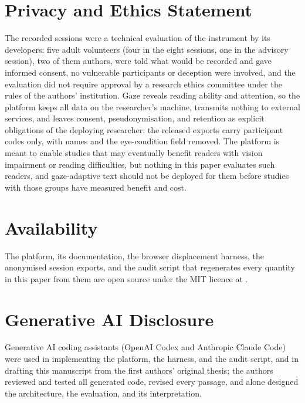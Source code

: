 \documentclass[sigconf,screen]{acmart}
\begin{document}
\section*{Privacy and Ethics Statement}
The recorded sessions were a technical evaluation of the instrument by its developers: five adult volunteers (four in the eight sessions, one in the advisory session), two of them authors, were told what would be recorded and gave informed consent, no vulnerable participants or deception were involved, and the evaluation did not require approval by a research ethics committee under the rules of the authors' institution.
Gaze reveals reading ability and attention, so the platform keeps all data on the researcher's machine, transmits nothing to external services, and leaves consent, pseudonymisation, and retention as explicit obligations of the deploying researcher; the released exports carry participant codes only, with names and the eye-condition field removed.
The platform is meant to enable studies that may eventually benefit readers with vision impairment or reading difficulties, but nothing in this paper evaluates such readers, and gaze-adaptive text should not be deployed for them before studies with those groups have measured benefit and cost.

\section*{Availability}
The platform, its documentation, the browser displacement harness, the anonymised session exports, and the audit script that regenerates every quantity in this paper from them are open source under the MIT licence at .

\section*{Generative AI Disclosure}
Generative AI coding assistants (OpenAI Codex and Anthropic Claude Code) were used in implementing the platform, the harness, and the audit script, and in drafting this manuscript from the first authors' original thesis; the authors reviewed and tested all generated code, revised every passage, and alone designed the architecture, the evaluation, and its interpretation.
\end{document}
